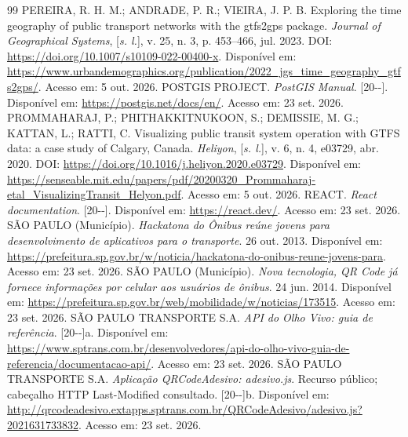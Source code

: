 \documentclass[12pt,oneside,a4paper,brazil,chapter=TITLE]{abntex2}
\begin{document}
\begin{thebibliography}{99}
 PEREIRA, R. H. M.; ANDRADE, P. R.; VIEIRA, J. P. B. Exploring the time geography of public transport networks with the gtfs2gps package. \textit{Journal of Geographical Systems}, [\textit{s. l.}], v. 25, n. 3, p. 453--466, jul. 2023. DOI: \url{https://doi.org/10.1007/s10109-022-00400-x}. Disponível em: \url{https://www.urbandemographics.org/publication/2022_jgs_time_geography_gtfs2gps/}. Acesso em: 5 out. 2026.
 POSTGIS PROJECT. \textit{PostGIS Manual}. [20\mbox{-}\mbox{-}]. Disponível em: \url{https://postgis.net/docs/en/}. Acesso em: 23 set. 2026.
 PROMMAHARAJ, P.; PHITHAKKITNUKOON, S.; DEMISSIE, M. G.; KATTAN, L.; RATTI, C. Visualizing public transit system operation with GTFS data: a case study of Calgary, Canada. \textit{Heliyon}, [\textit{s. l.}], v. 6, n. 4, e03729, abr. 2020. DOI: \url{https://doi.org/10.1016/j.heliyon.2020.e03729}. Disponível em: \url{https://senseable.mit.edu/papers/pdf/20200320_Prommaharaj-etal_VisualizingTransit_Helyon.pdf}. Acesso em: 5 out. 2026.
 REACT. \textit{React documentation}. [20\mbox{-}\mbox{-}]. Disponível em: \url{https://react.dev/}. Acesso em: 23 set. 2026.
 SÃO PAULO (Município). \textit{Hackatona do Ônibus reúne jovens para desenvolvimento de aplicativos para o transporte}. 26 out. 2013. Disponível em: \url{https://prefeitura.sp.gov.br/w/noticia/hackatona-do-onibus-reune-jovens-para}. Acesso em: 23 set. 2026.
 SÃO PAULO (Município). \textit{Nova tecnologia, QR Code já fornece informações por celular aos usuários de ônibus}. 24 jun. 2014. Disponível em: \url{https://prefeitura.sp.gov.br/web/mobilidade/w/noticias/173515}. Acesso em: 23 set. 2026.
 SÃO PAULO TRANSPORTE S.A. \textit{API do Olho Vivo: guia de referência}. [20\mbox{-}\mbox{-}]a. Disponível em: \url{https://www.sptrans.com.br/desenvolvedores/api-do-olho-vivo-guia-de-referencia/documentacao-api/}. Acesso em: 23 set. 2026.
 SÃO PAULO TRANSPORTE S.A. \textit{Aplicação QRCodeAdesivo: adesivo.js}. Recurso público; cabeçalho HTTP Last-Modified consultado. [20\mbox{-}\mbox{-}]b. Disponível em: \url{http://qrcodeadesivo.extapps.sptrans.com.br/QRCodeAdesivo/adesivo.js?2021631733832}. Acesso em: 23 set. 2026.

\end{thebibliography}
\end{document}
